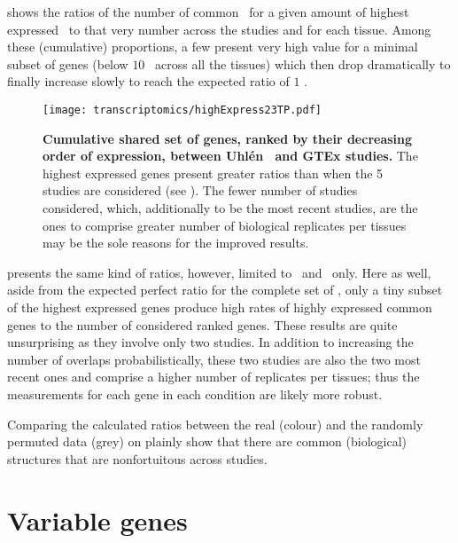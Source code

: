  shows the ratios of the number of
common \pcgs\ for a given amount of highest expressed \pcgs\
to that very number across the studies and for each tissue.
Among these (cumulative) proportions,
a few present very high value for
a minimal subset of genes (below $10$ \FPKM\ across all the tissues)
which then drop dramatically to finally increase slowly
to reach the expected ratio of $1$ \FPKM{}.
\begin{comment}
as the \pcgs\ set across the studies is identical.
\end{comment}

\begin{figure}[!htbp]
    \texttt{[image: transcriptomics/highExpress23TP.pdf]}\centering
    \caption[Cumulative shared set of genes, sorted by their expression, between
    Uhlen and GTEx]{\label{fig:highExpress23T}\textbf{Cumulative shared set of
    genes, ranked by their decreasing order of expression, between Uhlén \etal\
    and GTEx studies.}
    The highest expressed genes present greater ratios than
    when the 5 studies are considered (see ).
    The fewer number of studies considered, which, additionally to be the most
    recent studies, are the ones to comprise greater number of biological
    replicates per tissues may be the sole reasons for the improved results.}
\end{figure}

 presents the same kind of ratios,
however, limited to \uhlen\ and \gtex\ only.
Here as well, aside from the expected perfect ratio for the complete set of
\pcgs,
only a tiny subset of the highest expressed genes produce high rates of
highly expressed common genes to the number of considered ranked genes.
These results are quite unsurprising as they involve only two studies.
In addition to increasing the number of overlaps probabilistically,
these two studies are also the two most recent ones
and comprise a higher number of replicates per tissues;
thus the measurements for each gene in each condition are likely more robust.

Comparing the calculated ratios between the real (colour) and
the randomly permuted data (grey)
on \Cref{fig:highExpress4T,fig:highExpress23T}
plainly show that there are common (biological) structures
that are nonfortuitous across studies.
\FloatBarrier\
\section{Variable genes}

